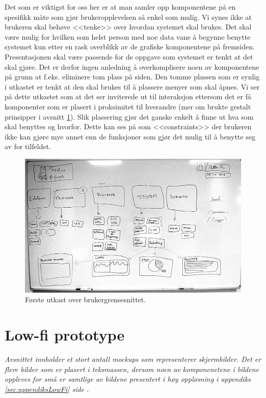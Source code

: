 Det som er viktigst for oss her er at man samler opp komponentene på en spesifikk måte som gjør brukeropplevelsen så enkel som mulig. Vi synes ikke at brukeren skal behøve <<tenke>> over hvordan systemet skal brukes. Det skal være mulig for hvilken som helst person med noe data vane å begynne benytte systemet kun etter en rask overblikk av de grafiske komponentene på fremsiden.
Presentasjonen skal være passende for de oppgave som systemet er tenkt at det skal gjøre. Det er derfor ingen anledning å overkomplisere noen av komponentene på grunn at f.eks. eliminere tom plass på siden. Den tomme plassen som er synlig i utkastet er tenkt at den skal brukes til å plassere menyer som skal åpnes. Vi ser på dette utkastet som at det ser inviterede ut til interaksjon ettersom det er få komponenter som er plasert i proksimitet til hverandre (mer om brukte gestalt prinsipper i avsnitt \ref{sec:lowfi}). Slik plassering gjør det ganske enkelt å finne ut hva som skal benyttes og hvorfor. Dette kan ses på som <<constraints>> der brukeren ikke kan gjøre mye annet enn de funksjoner som gjør det mulig til å benytte seg av for tilfeldet.\cite{nielsen2000designing}



\begin{figure}
\includegraphics[width=\textwidth,height=\textheight,keepaspectratio]{./img/prosessdokumentasjon/foersteutkast/foerste.jpg}
\caption[Første utkast]{Første utkast over brukergrensesnittet.}
\label{fig:foersteutkast}
\end{figure}

\section{Low-fi prototype} \label{sec:lowfi}
\emph{Avsnittet innholder et stort antall mockups som representerer skjermbilder. Det er flere bilder som er plasert i teksmassen, dersom noen av komponenetene i bildene oppleves for små er samtlige av bildene presentert i høy oppløsning i appendiks \ref{sec:appendiksLowFi} side \pageref{sec:appendiksLowFi}.}

